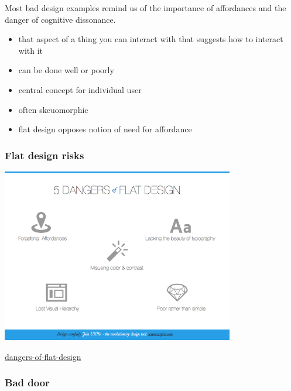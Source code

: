 Most bad design examples remind us of the importance of affordances and
the danger of cognitive dissonance.

\begin{itemize}
\tightlist
\item
  that aspect of a thing you can interact with that suggests how to
  interact with it
\item
  can be done well or poorly
\item
  central concept for individual user
\item
  often skeuomorphic
\item
  flat design opposes notion of need for affordance
\end{itemize}

\hypertarget{flat-design-risks}{%
\subsubsection{Flat design risks}\label{flat-design-risks}}

\begin{center}
  \includegraphics[width=4.0in]{fiFlatDanger.png}
\end{center}

\href{http://blog.uxpin.com/2526/5-dangers-of-flat-design/}{dangers-of-flat-design}

\hypertarget{bad-door}{%
\subsubsection{Bad door}\label{bad-door}}

